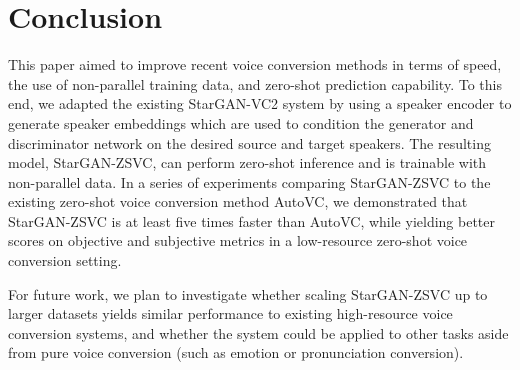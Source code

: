 \section{Conclusion}

This paper aimed to improve recent voice conversion methods in terms of speed, the use of non-parallel training data, and zero-shot prediction capability.
To this end, we adapted the existing StarGAN-VC2 system by using a speaker encoder to generate speaker embeddings which are used to condition the generator and discriminator network on the desired source and target speakers.
The resulting model, StarGAN-ZSVC, can perform zero-shot inference and is trainable with non-parallel data.
In a series of experiments comparing StarGAN-ZSVC to the existing zero-shot voice conversion method AutoVC, we demonstrated that StarGAN-ZSVC is at least five times faster than AutoVC, while yielding better scores on objective and subjective metrics in a low-resource zero-shot voice conversion setting. 

For future work, we 
plan to investigate whether scaling StarGAN-ZSVC up to larger datasets yields similar performance to existing high-resource voice conversion
systems, and whether the system could be applied to other tasks aside from pure voice conversion (such as emotion or pronunciation conversion).


